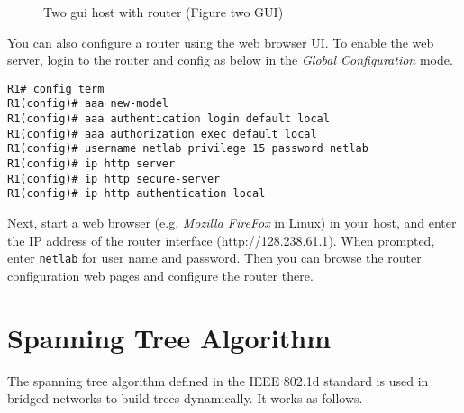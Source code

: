 \documentclass{../UTNetLab}
\begin{document}
\begin{figure}[H]
    \centering
    \caption{Two gui host with router (Figure two GUI)}
    \label{fig:two-gui}
\end{figure}

You can also configure a router using the web browser UI.
To enable the web server, login to the router and config as below  in the \textit{Global Configuration} mode.

\begin{lstlisting}[language={cisco},emph={netlab}]
R1# config term
R1(config)# aaa new-model
R1(config)# aaa authentication login default local
R1(config)# aaa authorization exec default local
R1(config)# username netlab privilege 15 password netlab
R1(config)# ip http server
R1(config)# ip http secure-server
R1(config)# ip http authentication local
    \end{lstlisting}

Next, start a web browser (e.g. \textit{Mozilla FireFox} in Linux) in your host, and enter the IP address of the router interface (\url{http://128.238.61.1}).
When prompted, enter \texttt{netlab} for user name and password.
Then you can browse the router configuration web pages and configure the router there.


\newpage
\appendix

\section{Spanning Tree Algorithm}
\label{appendix:spanningTree}
The spanning tree algorithm defined in the IEEE 802.1d standard is used in bridged networks to build trees dynamically.
It works as follows.
\end{document}
